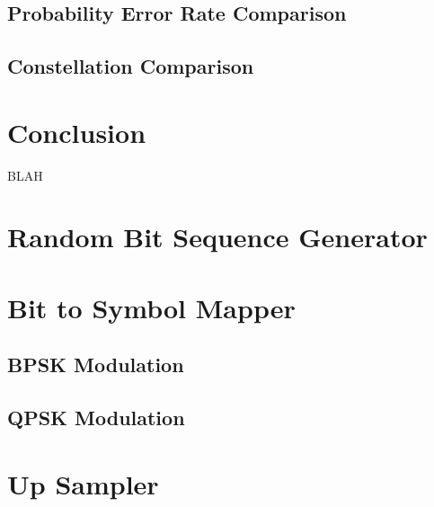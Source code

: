 \documentclass[]{article}
\begin{document}
\newpage
\subsection{Probability Error Rate Comparison}
\label{sec:compare}

\newpage
\subsection{Constellation Comparison}
\label{sec:constCompare}

\newpage
\section{Conclusion}
\label{sec:conc}

BLAH

\appendix
\newpage


\newpage
%

\section{Random Bit Sequence Generator}
\label{app:random_bit_generator}


\section{Bit to Symbol Mapper}
\label{app:bittosym}
\subsection{BPSK Modulation}
\label{app:bpsk_mod}


\subsection{QPSK Modulation}
\label{app:qpsk_mod}


\section{Up Sampler}
\label{app:impulse_train}

\end{document}
